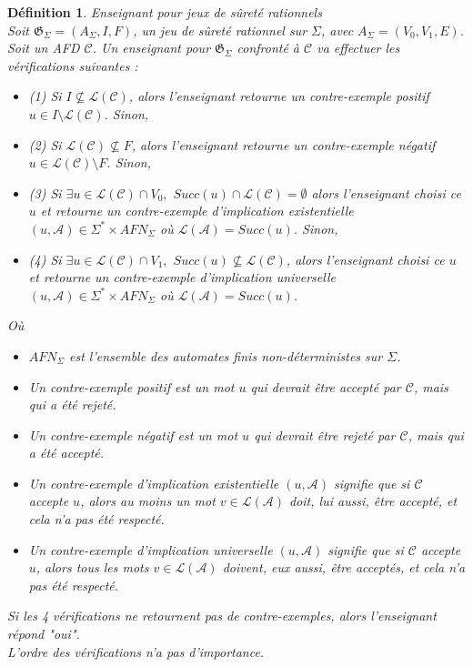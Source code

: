 \documentclass[12pt,a4paper,oneside,titlepage]{report}
\newtheorem{defi}{D\'efinition}[section]
\begin{document}
\begin{defi}{Enseignant pour jeux de sûreté rationnels\\}
\label{teacher}
Soit $\mathfrak{G}_\Sigma=(A_\Sigma, I, F)$, un jeu de sûreté rationnel sur $\Sigma$, avec $A_\Sigma=(V_0,V_1,E)$. Soit un AFD $\mathcal{C}$. Un enseignant pour $\mathfrak{G}_\Sigma$ confronté à $\mathcal{C}$ va effectuer les vérifications suivantes :\\
\begin{itemize}
\item (1) Si $I\nsubseteq \mathcal{L}(\mathcal{C})$, alors l'enseignant retourne un \emph{contre-exemple positif} $u\in I\setminus \mathcal{L}(\mathcal{C})$. Sinon,
\item (2) Si $\mathcal{L}(\mathcal{C}) \nsubseteq F$, alors l'enseignant retourne un \emph{contre-exemple négatif} $u\in \mathcal{L}(\mathcal{C})\setminus F$. Sinon, 
\item (3) Si $\exists u\in \mathcal{L}(\mathcal{C})\cap V_0,$ $Succ(u)\cap \mathcal{L}(\mathcal{C})=\emptyset$ alors l'enseignant choisi ce $u$ et retourne un \emph{contre-exemple d'implication existentielle} $(u, \mathcal{A})\in \Sigma^* \times AFN_\Sigma$ où $\mathcal{L}(\mathcal{A})=Succ(u)$. Sinon, 
\item (4) Si $\exists u\in \mathcal{L}(\mathcal{C})\cap V_1,$ $Succ(u)\nsubseteq \mathcal{L}(\mathcal{C})$, alors l'enseignant choisi ce $u$ et retourne un \emph{contre-exemple d'implication universelle} $(u, \mathcal{A})\in \Sigma^* \times AFN_\Sigma$ où $\mathcal{L}(\mathcal{A})=Succ(u)$.
\end{itemize}
Où 
\begin{itemize}
\item $AFN_\Sigma$ est l'ensemble des automates finis non-déterministes sur $\Sigma$.
\item Un \emph{contre-exemple positif} est un mot $u$ qui devrait être accepté par $\mathcal{C}$, mais qui a été rejeté.
\item Un \emph{contre-exemple négatif} est un mot $u$ qui devrait être rejeté par $\mathcal{C}$, mais qui a été accepté.
\item Un \emph{contre-exemple d'implication existentielle} $(u, \mathcal{A})$ signifie que si $\mathcal{C}$ accepte $u$, alors au moins un mot $v \in \mathcal{L}(\mathcal{A})$ doit, lui aussi, être accepté, et cela n'a pas été respecté.
\item Un \emph{contre-exemple d'implication universelle} $(u, \mathcal{A})$ signifie que si $\mathcal{C}$ accepte $u$, alors tous les mots $v \in \mathcal{L}(\mathcal{A})$ doivent, eux aussi, être acceptés, et cela n'a pas été respecté.\\
\end{itemize}

\noindent Si les 4 vérifications ne retournent pas de contre-exemples, alors l'enseignant répond "\emph{oui}".\\
L'ordre des vérifications n'a pas d'importance.
\end{defi}
\end{document}
